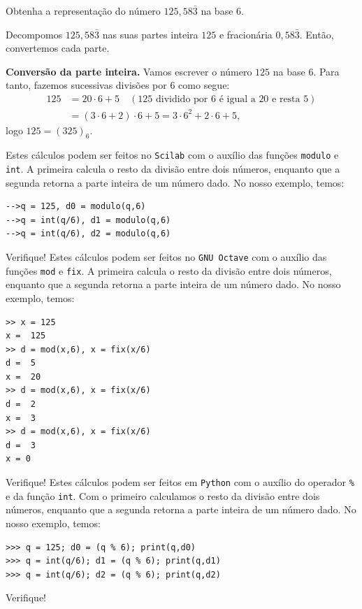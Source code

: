\begin{exeresol}
Obtenha a representação do número $125,58\bar{3}$ na base $6$.
\end{exeresol}
\begin{resol}
  Decompomos $125,58\bar{3}$ nas suas partes inteira $125$ e fracionária $0,58\bar{3}$. Então, convertemos cada parte.

  {\bf Conversão da parte inteira.} Vamos escrever o número $125$ na base $6$. Para tanto, fazemos sucessivas divisões por $6$ como segue:
  \begin{equation}
    \begin{split}
      125 &= 20\cdot 6 + 5\quad(\mbox{$125$ dividido por $6$ é igual a $20$ e resta $5$})\\
      &= (3\cdot 6 + 2)\cdot 6 + 5 = 3\cdot 6^2 + 2\cdot 6 + 5,
    \end{split}
  \end{equation}
logo $125 = (325)_6$.

\ifisscilab
Estes cálculos podem ser feitos no \verb+Scilab+ com o auxílio das funções \verb'modulo' e \verb'int'. A primeira calcula o resto da divisão entre dois números, enquanto que a segunda retorna a parte inteira de um número dado. No nosso exemplo, temos:
\begin{verbatim}
-->q = 125, d0 = modulo(q,6)
-->q = int(q/6), d1 = modulo(q,6)
-->q = int(q/6), d2 = modulo(q,6)
\end{verbatim}
Verifique!
\fi
\ifisoctave
Estes cálculos podem ser feitos no \verb+GNU Octave+ com o auxílio das funções \verb'mod' e \verb'fix'. A primeira calcula o resto da divisão entre dois números, enquanto que a segunda retorna a parte inteira de um número dado. No nosso exemplo, temos:
\begin{verbatim}
>> x = 125
x =  125
>> d = mod(x,6), x = fix(x/6)
d =  5
x =  20
>> d = mod(x,6), x = fix(x/6)
d =  2
x =  3
>> d = mod(x,6), x = fix(x/6)
d =  3
x = 0
\end{verbatim}
Verifique!
\fi
\ifispython
Estes cálculos podem ser feitos em \verb+Python+ com o auxílio do operador \verb+%+ e da função \verb'int'. Com o primeiro calculamos o resto da divisão entre dois números, enquanto que a segunda retorna a parte inteira de um número dado. No nosso exemplo, temos:
\begin{verbatim}
>>> q = 125; d0 = (q % 6); print(q,d0)
>>> q = int(q/6); d1 = (q % 6); print(q,d1)
>>> q = int(q/6); d2 = (q % 6); print(q,d2)
\end{verbatim}
Verifique!
\fi


\end{resol}
